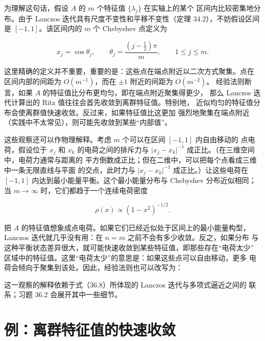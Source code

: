 \documentclass[UTF8,fontset=none,12pt]{ctexart}
\begin{document}
为理解这句话，假设 $A$ 的 $m$ 个特征值 $\{\lambda_j\}$ 在实轴上的某个
区间内比较密集地分布。由于 Lanczos 迭代具有尺度不变性和平移不变性（定理
34.2），不妨假设区间是 $[-1,1]$。该区间内的 $m$ 个 Chebyshev 点定义为

\begin{equation}
x_j=\cos\theta_j,\qquad
\theta_j=\frac{(j-\tfrac12)\pi}{m},
\qquad 1\leq j\leq m.
\tag{36.9}
\end{equation}

这里精确的定义并不重要，重要的是：这些点在端点附近以二次方式聚集。点在
区间内部的间距为 $O(m^{-1})$，而在 $\pm1$ 附近的间距为 $O(m^{-2})$。
经验法则断言，如果 $A$ 的特征值比分布更均匀，即在端点附近聚集得更少，
那么 Lanczos 迭代计算出的 Ritz 值往往会首先收敛到离群特征值。特别地，
近似均匀的特征值分布会使离群值快速收敛。反过来，如果特征值比这更加
强烈地聚集在端点附近（实践中不太常见），则可能先收敛到某些“内部值”。

这些观察还可以作物理解释。考虑 $m$ 个可以在区间 $[-1,1]$ 内自由移动的
点电荷，假设位于 $x_j$ 和 $x_k$ 的电荷之间的排斥力与
$\lvert x_j-x_k\rvert^{-1}$ 成正比。（在三维空间中，电荷力通常与距离的
平方倒数成正比；但在二维中，可以把每个点看成三维中一条无限直线与平面
的交点，此时力与 $\lvert x_j-x_k\rvert^{-1}$ 成正比。）让这些电荷在
$[-1,1]$ 内达到最小能量平衡。这个最小能量分布与 Chebyshev 分布近似相同；
当 $m\to\infty$ 时，它们都趋于一个连续电荷密度

\[
\rho(x)\propto(1-x^2)^{-1/2}.
\]

把 $A$ 的特征值想象成点电荷。如果它们已经近似处于区间上的最小能量构型，
Lanczos 迭代就几乎没有用：在 $n=m$ 之前不会有多少收敛。反之，如果分布
与这种平衡状态差异很大，就可能快速收敛到某些特征值，即那些存在“电荷太少”
区域中的特征值。这里“电荷太少”的意思是：如果这些点可以自由移动，更多
电荷会倾向于聚集到该处。因此，经验法则也可以改写为：

\begin{center}
\end{center}

这一观察的解释依赖于式（36.8）所体现的 Lanczos 迭代与多项式逼近之间的
联系；习题 36.2 会展开其中一些细节。

\section*{例：离群特征值的快速收敛}
\end{document}
